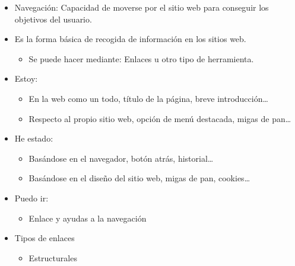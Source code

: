 \documentclass[12pt, twoside, openright]{report} %
\begin{document}
\begin{itemize}
    \item Navegación: Capacidad de moverse por el sitio web para conseguir
      los objetivos del usuario.
    \item Es la forma básica de recogida de información en los sitios web.
      \begin{itemize}
        \item Se puede hacer mediante: Enlaces u otro tipo de herramienta.
      \end{itemize}

      \item Estoy:

      \begin{itemize}
      
        \item
          En la web como un todo, título de la página, breve
          introducción\ldots{}
        \item
          Respecto al propio sitio web, opción de menú destacada, migas
          de pan\ldots{}
      \end{itemize}
      \pagebreak

    \item He estado:

    \begin{itemize}
      
        \item
          Basándose en el navegador, botón atrás, historial\ldots{}
        \item
          Basándose en el diseño del sitio web, migas de pan,
          cookies\ldots{}
      \end{itemize}

      \item Puedo ir:

    \begin{itemize}
      
        \item
          Enlace y ayudas a la navegación
      \end{itemize}
    \item Tipos de enlaces

      \begin{itemize}
      
        \item
          Estructurales

          \begin{itemize}
          

\end{itemize}
\end{itemize}
\end{itemize}
\end{document}
